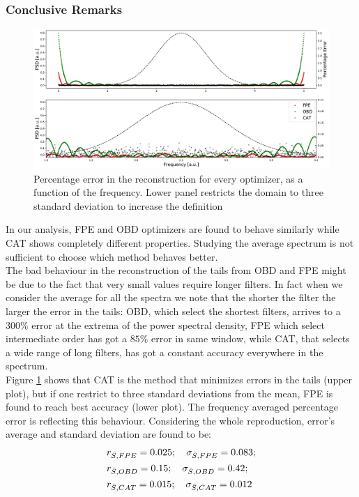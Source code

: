 \documentclass[twocolumn,showpacs,preprintnumbers,nofootinbib,prd,
superscriptaddress,10pt]{revtex4-1}
\begin{document}
\subsubsection{Conclusive Remarks}
\begin{figure}
    \centering
    \includegraphics[width = \linewidth]{Images/NormalPSD/Normal Residuals.pdf}
    \caption{Percentage error in the reconstruction for every optimizer, as a function of the frequency. Lower panel restricts the domain to three standard deviation to increase the definition}
    \label{fig:NormalEnsembleResiduals}
\end{figure}
In our analysis, FPE and OBD optimizers are found to behave similarly while CAT shows completely different properties. Studying the average spectrum is not sufficient to choose which method behaves better. \\ 
The bad behaviour in the reconstruction of the tails from OBD and FPE might be due to the fact that very small values require longer filters. 
In fact when we consider the average for all the spectra we note that the shorter the filter the larger the error in the tails: OBD, which select the shortest filters, arrives to a $300 \%$ error at the extrema of the power spectral density, FPE which select intermediate order has got a $85\%$ error in same window, while CAT, that selects a wide range of long filters, has got a constant accuracy everywhere in the spectrum.  \\ 
Figure \ref{fig:NormalEnsembleResiduals} shows that CAT is the method that minimizes errors in the tails (upper plot), but if one restrict to three standard deviations from the mean, FPE is found to reach best accuracy (lower plot). 
The frequency averaged percentage error is reflecting this behaviour. Considering the whole reproduction, error's average and standard deviation are found to be: 
\begin{align*}
\centering
&r_{\bar S, FPE} = 0.025; \quad \sigma_{\bar S, FPE} = 0.083;  \\
&r_{\bar S, OBD} = 0.15;\quad \sigma_{\bar S, OBD} = 0.42 ; \\ 
&r_{\bar S, CAT} = 0.015; \quad \sigma_{\bar S, CAT} = 0.012
\end{align*}
\end{document}
